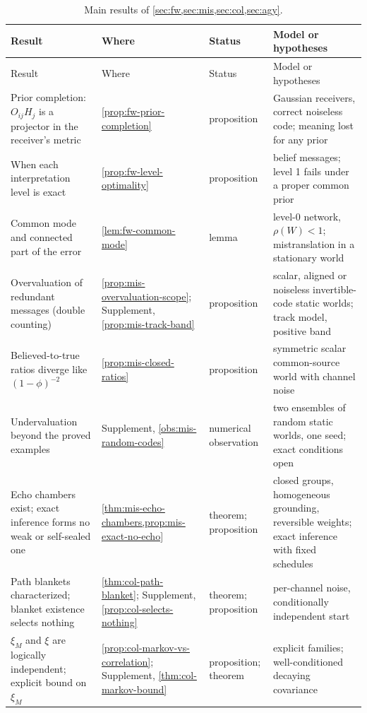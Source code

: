 \begingroup
\small
\setlength{\tabcolsep}{3pt}
\begin{longtable}{@{}>{\raggedright\arraybackslash}p{}>{\raggedright\arraybackslash}p{}>{\raggedright\arraybackslash}p{}>{\raggedright\arraybackslash}p{}@{}}
\caption{Main results of \cref{sec:fw,sec:mis,sec:col,sec:agy}.}\label{tab:int-results-a}\\
\toprule
Result & Where & Status & Model or hypotheses\\
\midrule
\endfirsthead
\toprule
Result & Where & Status & Model or hypotheses\\
\midrule
\endhead
\bottomrule
\endfoot
Prior completion: $O_{ij}H_j$ is a projector in the receiver's metric & \cref{prop:fw-prior-completion} & proposition & Gaussian receivers, correct noiseless code; meaning lost for any prior\\
When each interpretation level is exact & \cref{prop:fw-level-optimality} & proposition & belief messages; level 1 fails under a proper common prior\\
Common mode and connected part of the error & \cref{lem:fw-common-mode} & lemma & level-0 network, $\rho(W)<1$; mistranslation in a stationary world\\
\addlinespace[2pt]
Overvaluation of redundant messages (double counting) & \cref{prop:mis-overvaluation-scope}; Supplement, \cref{prop:mis-track-band} & proposition & scalar, aligned or noiseless invertible-code static worlds; track model, positive band\\
Believed-to-true ratios diverge like $(1-\phi)^{-2}$ & \cref{prop:mis-closed-ratios} & proposition & symmetric scalar common-source world with channel noise\\
Undervaluation beyond the proved examples & Supplement, \cref{obs:mis-random-codes} & numerical observation & two ensembles of random static worlds, one seed; exact conditions open\\
Echo chambers exist; exact inference forms no weak or self-sealed one & \cref{thm:mis-echo-chambers,prop:mis-exact-no-echo} & theorem; proposition & closed groups, homogeneous grounding, reversible weights; exact inference with fixed schedules\\
\addlinespace[2pt]
Path blankets characterized; blanket existence selects nothing & \cref{thm:col-path-blanket}; Supplement, \cref{prop:col-selects-nothing} & theorem; proposition & per-channel noise, conditionally independent start\\
$\xi_M$ and $\xi$ are logically independent; explicit bound on $\xi_M$ & \cref{prop:col-markov-vs-correlation}; Supplement, \cref{thm:col-markov-bound} & proposition; theorem & explicit families; well-conditioned decaying covariance\\

\end{longtable}
